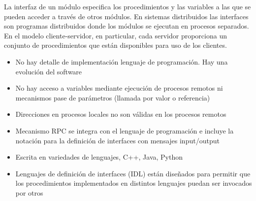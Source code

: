 La interfaz de un módulo especifica los procedimientos y las variables a las que se pueden acceder a trav\'es de  otros módulos. 
En sistemas distribuidos las interfaces son  programas distribuidos donde los módulos se ejecutan en procesos separados.
En el modelo cliente-servidor, en particular, cada servidor proporciona un conjunto de procedimientos que están disponibles para uso de los clientes.
\begin{itemize}
	\item No hay detalle de implementación lenguaje de programación. Hay una evolución del software
	\item No hay acceso a variables mediante ejecución de procesos remotos ni mecanismos pase de parámetros (llamada por valor o referencia)
	\item  Direcciones en procesos locales no son válidas en los procesos remotos
	
	\item  Mecanismo RPC se integra con el lenguaje de programación e incluye la notación  para la definición de interfaces con mensajes input/output
	\item Escrita en variedades de lenguajes, C++, Java, Python
	\item Lenguajes de definición de interfaces (IDL) están diseñados para permitir que los procedimientos implementados en distintos lenguajes puedan ser invocados por otros
	
\end{itemize}







